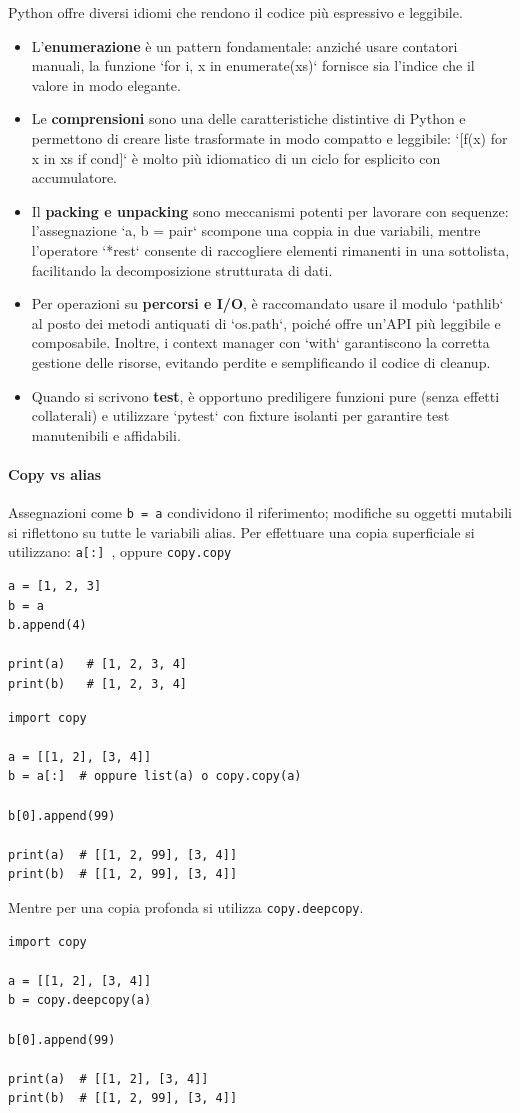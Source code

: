 \begin{tcolorbox}[title=Idiomi e differenze pratiche]
	Python offre diversi idiomi che rendono il codice più espressivo e leggibile.
	\begin{itemize}
		\item L'\textbf{enumerazione} è un pattern fondamentale: anziché usare contatori manuali, la funzione `for i, x in enumerate(xs)` fornisce sia l'indice che il valore in modo elegante.
		\item Le \textbf{comprensioni} sono una delle caratteristiche distintive di Python e permettono di creare liste trasformate in modo compatto e leggibile: `[f(x) for x in xs if cond]` è molto più idiomatico di un ciclo for esplicito con accumulatore.
		\item Il \textbf{packing e unpacking} sono meccanismi potenti per lavorare con sequenze: l'assegnazione `a, b = pair` scompone una coppia in due variabili, mentre l'operatore `*rest` consente di raccogliere elementi rimanenti in una sottolista, facilitando la decomposizione strutturata di dati.
		\item Per operazioni su \textbf{percorsi e I/O}, è raccomandato usare il modulo `pathlib` al posto dei metodi antiquati di `os.path`, poiché offre un'API più leggibile e composabile. Inoltre, i context manager con `with` garantiscono la corretta gestione delle risorse, evitando perdite e semplificando il codice di cleanup.
		\item Quando si scrivono \textbf{test}, è opportuno prediligere funzioni pure (senza effetti collaterali) e utilizzare `pytest` con fixture isolanti per garantire test manutenibili e affidabili.
	\end{itemize}
	
\end{tcolorbox}

\paragraph{Copy vs alias} Assegnazioni come \verb|b = a| condividono il riferimento; modifiche su oggetti mutabili si riflettono su tutte le variabili alias.
Per effettuare una copia superficiale si utilizzano: \verb|a[:] |, oppure \verb|copy.copy|
\begin{lstlisting}
a = [1, 2, 3]
b = a
b.append(4)

print(a)   # [1, 2, 3, 4]
print(b)   # [1, 2, 3, 4]
\end{lstlisting}
\begin{lstlisting}
import copy

a = [[1, 2], [3, 4]]
b = a[:]  # oppure list(a) o copy.copy(a)

b[0].append(99)

print(a)  # [[1, 2, 99], [3, 4]]
print(b)  # [[1, 2, 99], [3, 4]]
\end{lstlisting}
Mentre per una copia profonda si utilizza \verb|copy.deepcopy|.
\begin{lstlisting}
import copy

a = [[1, 2], [3, 4]]
b = copy.deepcopy(a)

b[0].append(99)

print(a)  # [[1, 2], [3, 4]]
print(b)  # [[1, 2, 99], [3, 4]]
\end{lstlisting}
